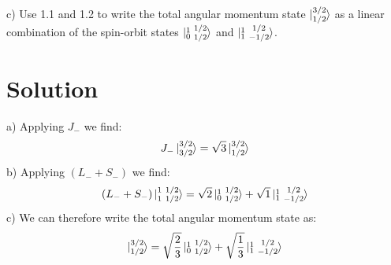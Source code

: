 \documentclass[a4paper,12pt]{article}
\numberwithin{equation}{section}
\begin{document}
c) Use 1.1 and 1.2 to write the total angular momentum state $\ket{ \substack{3/2 \\ 1/2} }$ 
as a linear combination of the spin-orbit states $\ket{\substack{1\\0}\ \substack{1/2\\1/2}}$ and $\ket{\substack{1\\1}\ \substack{1/2\\-1/2}}$.

\section{Solution}
a) Applying $J_-$ we find:
\begin{gather}
 J_-\ket{ \substack{3/2 \\ 3/2} } = \sqrt{3}\ket{ \substack{3/2 \\ 1/2} }
\end{gather}
b) Applying $(L_-+S_-)$ we find:
\begin{gather}
 (L_-+S_-)\ket{\substack{1\ 1/2\\ 1\ 1/2}}=\sqrt{2}\ket{\substack{1\\0}\ \substack{1/2\\1/2}}    
 + \sqrt{1}\ket{\substack{1\\1}\ \substack{1/2\\-1/2}}
\end{gather}
c) We can therefore write the total angular momentum state as:
\begin{gather}
 \ket{ \substack{3/2 \\ 1/2} }=\sqrt{\frac{2}{3}}\ket{\substack{1\\0}\ \substack{1/2\\1/2}}    
 + \sqrt{\frac{1}{3}}\ket{\substack{1\\1}\ \substack{1/2\\-1/2}}
\end{gather}
\end{document}
